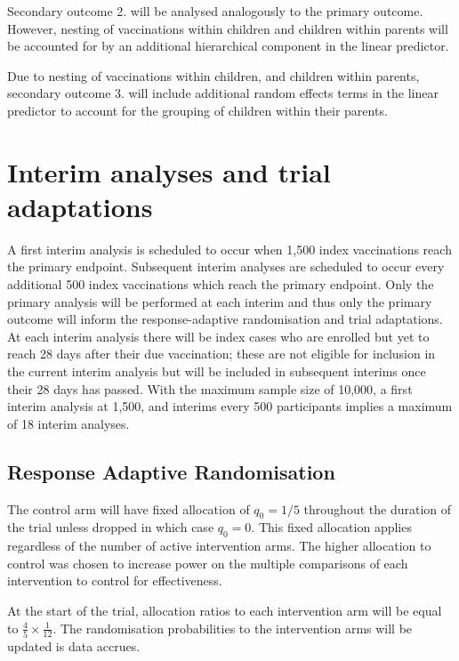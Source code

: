 \documentclass[
  bibliography=totoc]{scrreprt}
\begin{document}
Secondary outcome 2. will be analysed analogously to the primary outcome.
However, nesting of vaccinations within children and children within parents will be accounted for by an additional hierarchical component in the linear predictor.

Due to nesting of vaccinations within children, and children within parents, secondary outcome 3. will include additional random effects terms in the linear predictor to account for the grouping of children within their parents.

\hypertarget{interim-analyses-and-trial-adaptations}{%
\section{Interim analyses and trial adaptations}\label{interim-analyses-and-trial-adaptations}}

A first interim analysis is scheduled to occur when 1,500 index vaccinations reach the primary endpoint.
Subsequent interim analyses are scheduled to occur every additional 500 index vaccinations which reach the primary endpoint.
Only the primary analysis will be performed at each interim and thus only the primary outcome will inform the response-adaptive randomisation and trial adaptations.
At each interim analysis there will be index cases who are enrolled but yet to reach 28 days after their due vaccination; these are not eligible for inclusion in the current interim analysis but will be included in subsequent interims once their 28 days has passed.
With the maximum sample size of 10,000, a first interim analysis at 1,500, and interims every 500 participants implies a maximum of 18 interim analyses.

\hypertarget{response-adaptive-randomisation}{%
\subsection{Response Adaptive Randomisation}\label{response-adaptive-randomisation}}

The control arm will have fixed allocation of \(q_0=1/5\) throughout the duration of the trial unless dropped in which case \(q_0=0\).
This fixed allocation applies regardless of the number of active intervention arms.
The higher allocation to control was chosen to increase power on the multiple comparisons of each intervention to control for effectiveness.

At the start of the trial, allocation ratios to each intervention arm will be equal to \(\frac{4}{5}\times\frac{1}{12}\).
The randomisation probabilities to the intervention arms will be updated is data accrues.
\end{document}
